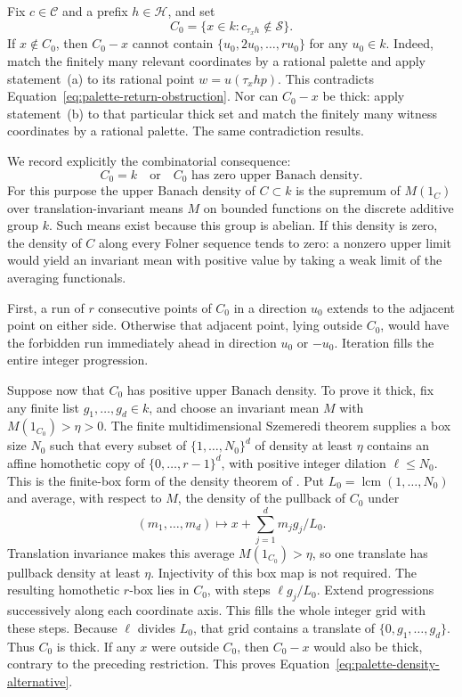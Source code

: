 Fix $c\in\mathcal C$ and a prefix $h\in\mathcal H$, and set
\[
 C_0=\{x\in k:c_{\tau_xh}\notin\mathcal S\}.
\]
If $x\notin C_0$, then $C_0-x$ cannot contain
$\{u_0,2u_0,\ldots,ru_0\}$ for any $u_0\in k$.
Indeed, match the finitely many relevant coordinates by a rational
palette and apply statement~\textup{(a)} to its rational point
$w=u(\tau_xhp)$. This contradicts
Equation~\ref{eq:palette-return-obstruction}.
Nor can $C_0-x$ be thick: apply statement~\textup{(b)} to that particular
thick set and match the finitely many witness coordinates by a rational
palette. The same contradiction results.

We record explicitly the combinatorial consequence:
\begin{equation}\label{eq:palette-density-alternative}
 C_0=k\quad\text{or}\quad C_0\text{ has zero upper Banach density}.
\end{equation}
For this purpose the upper Banach density of $C\subset k$ is the
supremum of $M(1_C)$ over translation-invariant means $M$ on bounded
functions on the discrete additive group $k$. Such means exist because
this group is abelian. If this density is zero, the density of $C$ along
every Folner sequence tends to zero: a nonzero upper limit would yield
an invariant mean with positive value by taking a weak limit of the
averaging functionals.

First, a run of $r$ consecutive points of $C_0$ in a direction $u_0$
extends to the adjacent point on either side. Otherwise that adjacent
point, lying outside $C_0$, would have the forbidden run immediately
ahead in direction $u_0$ or $-u_0$. Iteration fills the entire integer
progression.

Suppose now that $C_0$ has positive upper Banach density. To prove it
thick, fix any finite list $g_1,\ldots,g_d\in k$, and choose an invariant
mean $M$ with $M(1_{C_0})>\eta>0$. The finite multidimensional
Szemeredi theorem supplies a box size $N_0$ such that every subset of
$\{1,\ldots,N_0\}^d$ of density at least $\eta$ contains an affine
homothetic copy of $\{0,\ldots,r-1\}^d$, with positive integer dilation
$\ell\leq N_0$. This is the finite-box form of the density theorem
of \cite[Theorem~B]{FurstenbergKatznelson}.
Put $L_0=\operatorname{lcm}(1,\ldots,N_0)$ and average, with respect to
$M$, the density of the pullback of $C_0$ under
\[
 (m_1,\ldots,m_d)\longmapsto
 x+\sum_{j=1}^d m_jg_j/L_0.
\]
Translation invariance makes this average $M(1_{C_0})>\eta$, so one
translate has pullback density at least $\eta$. Injectivity of this
box map is not required. The resulting homothetic $r$-box lies in
$C_0$, with steps $\ell g_j/L_0$. Extend progressions successively along
each coordinate axis. This fills the whole integer grid with these
steps. Because $\ell$ divides $L_0$, that grid contains a translate of
$\{0,g_1,\ldots,g_d\}$. Thus $C_0$ is thick. If any $x$ were outside
$C_0$, then $C_0-x$ would also be thick, contrary to the preceding
restriction. This proves Equation~\ref{eq:palette-density-alternative}.

